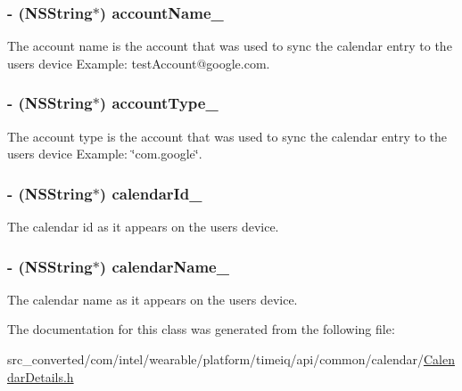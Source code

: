 \subsubsection[{account\+Name\+\_\+}]{\setlength{\rightskip}{0pt plus 5cm}-\/ (N\+S\+String$\ast$) account\+Name\+\_\+}\label{interface_calendar_details_a32f09966c244bb21bb5cb64723a61ac4}


The account name is the account that was used to sync the calendar entry to the user\textquotesingle{}s device Example\+: test\+Account@google.\+com. 

\hypertarget{interface_calendar_details_a44fa5f16d5d277caaab5482f1b500a0e}{}
\subsubsection[{account\+Type\+\_\+}]{\setlength{\rightskip}{0pt plus 5cm}-\/ (N\+S\+String$\ast$) account\+Type\+\_\+}\label{interface_calendar_details_a44fa5f16d5d277caaab5482f1b500a0e}


The account type is the account that was used to sync the calendar entry to the user\textquotesingle{}s device Example\+: \char`\"{}com.\+google\char`\"{}. 

\hypertarget{interface_calendar_details_a9b3e80787b1af5b49eb16a7571cc71a1}{}
\subsubsection[{calendar\+Id\+\_\+}]{\setlength{\rightskip}{0pt plus 5cm}-\/ (N\+S\+String$\ast$) calendar\+Id\+\_\+}\label{interface_calendar_details_a9b3e80787b1af5b49eb16a7571cc71a1}


The calendar id as it appears on the user\textquotesingle{}s device. 

\hypertarget{interface_calendar_details_a4b2d9d44ca1287bfd683d515aa5bf0df}{}
\subsubsection[{calendar\+Name\+\_\+}]{\setlength{\rightskip}{0pt plus 5cm}-\/ (N\+S\+String$\ast$) calendar\+Name\+\_\+}\label{interface_calendar_details_a4b2d9d44ca1287bfd683d515aa5bf0df}


The calendar name as it appears on the user\textquotesingle{}s device. 



The documentation for this class was generated from the following file\+:\begin{DoxyCompactItemize}
\item 
src\+\_\+converted/com/intel/wearable/platform/timeiq/api/common/calendar/\hyperlink{_calendar_details_8h}{Calendar\+Details.\+h}\end{DoxyCompactItemize}
